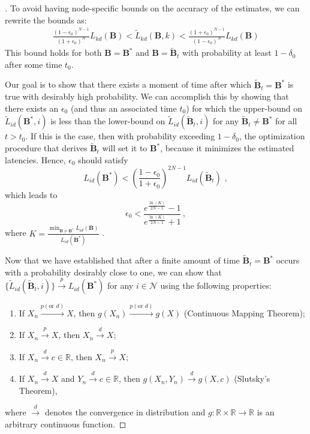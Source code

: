 \documentclass[journal,onecolumn,11pt]{IEEEtran}
\theoremstyle{plain}
\theoremstyle{definition}
\begin{document}
\begin{proof}[\unskip\nopunct]
To avoid having node-specific bounds on the accuracy of the estimates,
we can rewrite the bounds as:
\begin{equation}
\begin{aligned}
\frac{(1-\epsilon_0)^{N-1}}{(1+\epsilon_0)^{N}} L_{kd}(\mathbf{B})<\widetilde{L}_{kd}(\mathbf{B},k)<\frac{(1+\epsilon_0)^{N-1}}{(1-\epsilon_0)^{N}} L_{kd}(\mathbf{B})
\end{aligned}
\end{equation}
This bound holds for both $\mathbf{B} = \mathbf{B}^*$ and
$\mathbf{B} = \widetilde{\mathbf{B}}_{t}$ with probability at least
$1-\delta_0$ after some time $t_0$. 

Our goal is to show that there exists a moment of time after which
$\widetilde{\mathbf{B}}_t=\mathbf{B}^*$ is true with desirably high
probability. We can accomplish this by showing that there exists an
$\epsilon_0$ (and thus an associated time $t_0$) for which the upper-bound on
$\widetilde{L}_{id}(\mathbf{B}^*,i)$ is less than the lower-bound on
$\widetilde{L}_{id}(\widetilde{\mathbf{B}}_t,i)$ for any $\widetilde{\mathbf{B}}_t \neq
\mathbf{B}^*$ for all $t>t_0$. If this is the case, then with
probability exceeding $1-\delta_0$, the optimization procedure that
derives $\widetilde{\mathbf{B}}_t$ will set it to $\mathbf{B}^*$,
because it minimizes the estimated latencies.  Hence, $\epsilon_0$ should satisfy
\begin{equation}
L_{id}(\mathbf{B}^*)<(\frac{1-\epsilon_0}{1+\epsilon_0})^{2N-1} L_{id}(\widetilde{\mathbf{B}}_t)\,\,,
\end{equation}
which leads to
\begin{equation}
\epsilon_0<\frac{e^{\frac{\ln(K)}{2N-1}}-1}{e^{\frac{\ln(K)}{2N-1}}+1}\,,
\end{equation}
where $K=\frac{\min_{\mathbf{B}\neq\mathbf{B}^*} L_{id}(\mathbf{B})}{L_{id}(\mathbf{B}^*)}$ .

Now that we have established that after a finite amount of time
$\widetilde{\mathbf{B}}_t=\mathbf{B}^*$ occurs with a probability desirably
close to one, we can show that
$\{\widetilde{L}_{id}(\widetilde{\mathbf{B}}_t,i)\} \xrightarrow{p} L_{id}(\mathbf{B}^*)$ for any $i\in \mathcal{N}$ using the following properties:
\begin{enumerate}
\item If $X_n \xrightarrow{p (\text{or } d)} X$, then $g(X_n) \xrightarrow{p (\text{or } d)} g(X)$ (Continuous Mapping Theorem); 
\item If $X_n \xrightarrow{p} X$, then $X_n \xrightarrow{d} X$;
\item If $X_n \xrightarrow{d} c\in \mathbb{R}$, then $X_n \xrightarrow{p} X$; 
\item If $X_n \xrightarrow{d} X$ and $Y_n \xrightarrow{d} c \in \mathbb{R}$, then $g(X_n,Y_n) \xrightarrow{d} g(X,c)$ (Slutsky's Theorem),
\end{enumerate}
where $\xrightarrow{d}$ denotes the convergence in distribution and
$g:\mathbb{R}\times\mathbb{R} \rightarrow \mathbb{R}$ is an arbitrary
continuous function.


\end{proof}
\end{document}
